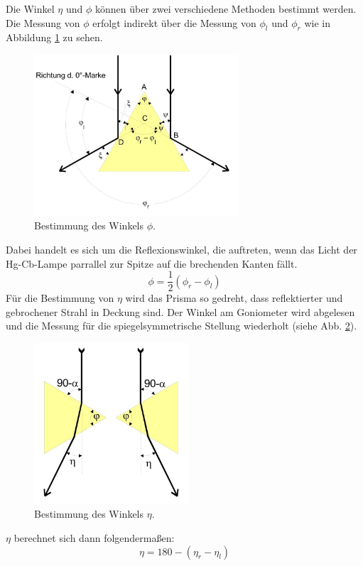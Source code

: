 Die Winkel $\eta$ und $\phi$ können über zwei verschiedene Methoden bestimmt werden.
Die Messung von $\phi$ erfolgt indirekt über die Messung von $\phi_l$ und $\phi_r$ wie in Abbildung \ref{fig:j5} zu sehen.
\begin{figure}
  \centering
  \includegraphics[height=6cm]{data/j5.jpg}
  \caption{Bestimmung des Winkels $\phi$. \cite{sample}}
  \label{fig:j5}
\end{figure}
Dabei handelt es sich um die Reflexionswinkel, die auftreten, wenn das Licht der Hg-Cb-Lampe parrallel zur Spitze auf die brechenden Kanten fällt.
\begin{equation}
  \phi = \frac{1}{2} (\phi_r - \phi_l)
\end{equation}
Für die Bestimmung von $\eta$ wird das Prisma so gedreht, dass reflektierter und gebrochener Strahl in Deckung sind.
Der Winkel am Goniometer wird abgelesen und die Messung für die spiegelsymmetrische Stellung wiederholt (siehe Abb. \ref{fig:j6}).
\begin{figure}
  \centering
  \includegraphics[height=6cm]{data/j6.jpg}
  \caption{Bestimmung des Winkels $\eta$. \cite{sample}}
  \label{fig:j6}
\end{figure}
$\eta$ berechnet sich dann folgendermaßen:
\begin{equation}
  \eta = 180 - (\eta_r - \eta_l)
\end{equation}
